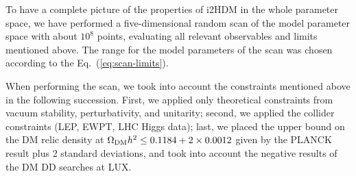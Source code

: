 \documentclass[12pt,a4paper]{article}
\begin{document}
To have a complete picture of the properties of i2HDM in the whole parameter space, we have performed a
five-dimensional random scan of the model parameter space with about $10^8$ points, evaluating all relevant
observables and limits mentioned above. The range for 
the model parameters of the scan was chosen according to the Eq.~(\ref{eq:scan-limits}).

When performing the scan, we took into account the constraints mentioned above
in the following succession. First, we applied only theoretical constraints from vacuum stability, 
perturbativity, and unitarity;
second, we applied the collider constraints (LEP, EWPT, LHC Higgs data);
last, we placed the upper bound on the DM relic density at $\Omega_{\rm DM} h^2 \le 0.1184+2\times 0.0012$ 
given by the PLANCK result plus 2 standard deviations, 
and took into account the negative results of the DM DD searches at LUX.
\end{document}
